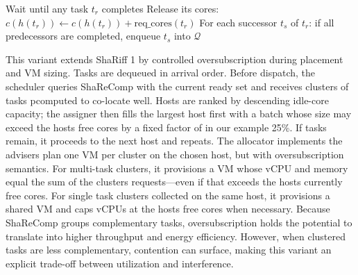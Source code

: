 \begin{algorithm}[H]
{        \BlankLine
        Wait until any task \( t_r \) completes
        Release its cores: \( c(h(t_r)) \gets c(h(t_r)) + \text{req\_cores}(t_r) \)
        For each successor \( t_s \) of \( t_r \): if all predecessors are completed, enqueue \( t_s \) into \( \mathcal{Q} \)
    }
\end{algorithm}

This variant extends ShaRiff 1 by controlled oversubscription during placement and VM sizing. Tasks are dequeued in arrival order. Before dispatch, the scheduler queries ShaReComp with the current ready set and receives clusters of tasks pcomputed to co-locate well. Hosts are ranked by descending idle-core capacity; the assigner then fills the largest host first with a batch whose size may exceed the hosts free cores by a fixed factor of in our example 25\%. If tasks remain, it proceeds to the next host and repeats.
The allocator implements the advisers plan one VM per cluster on the chosen host, but with oversubscription semantics. For multi-task clusters, it provisions a VM whose vCPU and memory equal the sum of the clusters requests—even if that exceeds the hosts currently free cores. For single task clusters collected on the same host, it provisions a shared VM and caps vCPUs at the hosts free cores when necessary.
Because ShaReComp groups complementary tasks, oversubscription holds the potential to translate into higher throughput and energy efficiency. However, when clustered tasks are less complementary, contention can surface, making this variant an explicit trade-off between utilization and interference.


